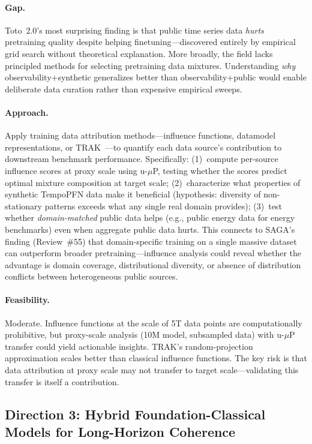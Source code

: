 \documentclass[11pt,a4paper]{article}
\begin{document}
\paragraph{Gap.}
Toto~2.0's most surprising finding is that public time series data \emph{hurts} pretraining quality despite helping finetuning---discovered entirely by empirical grid search without theoretical explanation. More broadly, the field lacks principled methods for selecting pretraining data mixtures. Understanding \emph{why} observability+synthetic generalizes better than observability+public would enable deliberate data curation rather than expensive empirical sweeps.

\paragraph{Approach.}
Apply training data attribution methods---influence functions, datamodel representations, or TRAK~\cite{park2023trak}---to quantify each data source's contribution to downstream benchmark performance. Specifically: (1)~compute per-source influence scores at proxy scale using u-$\mu$P, testing whether the scores predict optimal mixture composition at target scale; (2)~characterize what properties of synthetic TempoPFN data make it beneficial (hypothesis: diversity of non-stationary patterns exceeds what any single real domain provides); (3)~test whether \emph{domain-matched} public data helps (e.g., public energy data for energy benchmarks) even when aggregate public data hurts. This connects to SAGA's finding (Review~\#55) that domain-specific training on a single massive dataset can outperform broader pretraining---influence analysis could reveal whether the advantage is domain coverage, distributional diversity, or absence of distribution conflicts between heterogeneous public sources.

\paragraph{Feasibility.}
Moderate. Influence functions at the scale of 5T data points are computationally prohibitive, but proxy-scale analysis (10M model, subsampled data) with u-$\mu$P transfer could yield actionable insights. TRAK's random-projection approximation scales better than classical influence functions. The key risk is that data attribution at proxy scale may not transfer to target scale---validating this transfer is itself a contribution.

\subsection*{Direction 3: Hybrid Foundation-Classical Models for Long-Horizon Coherence}
\end{document}
